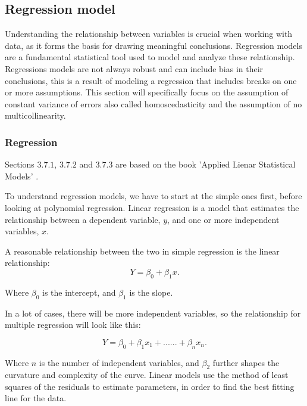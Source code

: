\subsection{Regression model}
Understanding the relationship between variables is crucial when working with data, as it forms the basis for drawing meaningful conclusions. Regression models are a fundamental statistical tool used to model and analyze these relationship. Regressions models are not always robust and can include bias in their conclusions, this is a result of modeling a regression that includes breaks on one or more assumptions. This section will specifically focus on the assumption of constant variance of errors also called homoscedasticity and the assumption of no multicollinearity.

\subsubsection{Regression}
Sections $3.7.1$, $3.7.2$ and $3.7.3$ are based on the book 'Applied Lienar Statistical Models' \cite{AppliedLSM}. 
\newline 

\noindent To understand regression models, we have to start at the simple ones first, before looking at polynomial regression. \newline 
Linear regression is a model that estimates the relationship between a dependent variable, \( y \), and one or more independent variables, \( x \).

\noindent A reasonable relationship between the two in simple regression is the linear relationship:
\begin{equation}
Y = \beta_0 + \beta_1 x .
\end{equation}


\noindent Where \( \beta_0 \) is the intercept, and \( \beta_1 \) is the slope.

\noindent In a lot of cases, there will be more independent variables, so the relationship for multiple regression will look like this:

\begin{equation}
	Y = \beta_0 + \beta_1 x_1 + ......+ \beta_n x_n .
\end{equation}




\noindent Where \( n \) is the number of independent variables, and $\beta_2$ further shapes the curvature and complexity of the curve. Linear models use the method of least squares of the residuals to estimate parameters, in order to find the best fitting line for the data.

